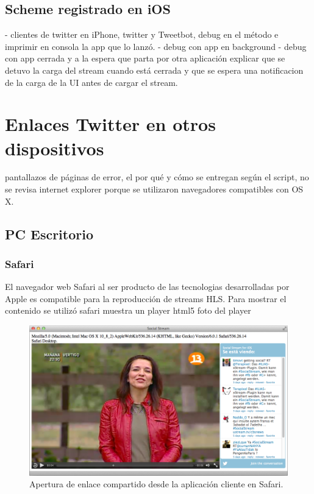   \subsection{Scheme registrado en iOS}
  
  
	- clientes de twitter en iPhone, twitter y Tweetbot, debug en el método e imprimir en consola la app que lo lanzó.  
	- debug con app en background
	- debug con app cerrada y a la espera que parta por otra aplicación
	explicar que se detuvo la carga del stream cuando está cerrada y que se espera una notificacion de la carga de la UI antes de cargar el stream.
  
\section{Enlaces Twitter en otros dispositivos}
	pantallazos de páginas de error, el por qué y cómo se entregan según el script, no se revisa internet explorer porque se utilizaron navegadores compatibles con OS X.
	
  \subsection{PC Escritorio}
    \subsubsection{Safari}
El navegador web Safari al ser producto de las tecnologias desarrolladas por Apple es compatible para la reproducción de streams HLS. Para mostrar el contenido se utilizó 
      safari muestra un player html5
    foto del player

  \begin{figure}[H]
	\centering
	\includegraphics[scale=0.4]{imgs/uagent-safari.png} 
	\caption{Apertura de enlace compartido desde la aplicación cliente en Safari.}
	\label{fig:uagent-safari}
\end{figure}  
    
